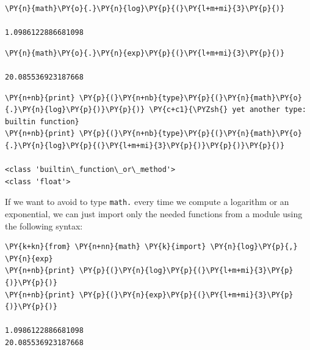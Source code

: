 \begin{tcolorbox}[breakable, size=fbox, boxrule=1pt, pad at break*=1mm, colback=cellbackground, colframe=cellborder]            
\begin{Verbatim}[commandchars=\\\{\}]
\PY{n}{math}\PY{o}{.}\PY{n}{log}\PY{p}{(}\PY{l+m+mi}{3}\PY{p}{)}

1.0986122886681098
\end{Verbatim}
\end{tcolorbox}

\begin{tcolorbox}[breakable, size=fbox, boxrule=1pt, pad at break*=1mm, colback=cellbackground, colframe=cellborder]            
\begin{Verbatim}[commandchars=\\\{\}]
\PY{n}{math}\PY{o}{.}\PY{n}{exp}\PY{p}{(}\PY{l+m+mi}{3}\PY{p}{)}

20.085536923187668
\end{Verbatim}
\end{tcolorbox}

\begin{tcolorbox}[breakable, size=fbox, boxrule=1pt, pad at break*=1mm, colback=cellbackground, colframe=cellborder]            
\begin{Verbatim}[commandchars=\\\{\}]
\PY{n+nb}{print} \PY{p}{(}\PY{n+nb}{type}\PY{p}{(}\PY{n}{math}\PY{o}{.}\PY{n}{log}\PY{p}{)}\PY{p}{)} \PY{c+c1}{\PYZsh{} yet another type: builtin function}
\PY{n+nb}{print} \PY{p}{(}\PY{n+nb}{type}\PY{p}{(}\PY{n}{math}\PY{o}{.}\PY{n}{log}\PY{p}{(}\PY{l+m+mi}{3}\PY{p}{)}\PY{p}{)}\PY{p}{)}

<class 'builtin\_function\_or\_method'>
<class 'float'>
\end{Verbatim}
\end{tcolorbox}

If we want to avoid to type \texttt{math.} every time we compute a logarithm or an exponential, we can just import only the needed functions from a module using the following syntax:

\begin{tcolorbox}[breakable, size=fbox, boxrule=1pt, pad at break*=1mm, colback=cellbackground, colframe=cellborder]            
\begin{Verbatim}[commandchars=\\\{\}]
\PY{k+kn}{from} \PY{n+nn}{math} \PY{k}{import} \PY{n}{log}\PY{p}{,} \PY{n}{exp}
\PY{n+nb}{print} \PY{p}{(}\PY{n}{log}\PY{p}{(}\PY{l+m+mi}{3}\PY{p}{)}\PY{p}{)}
\PY{n+nb}{print} \PY{p}{(}\PY{n}{exp}\PY{p}{(}\PY{l+m+mi}{3}\PY{p}{)}\PY{p}{)}

1.0986122886681098
20.085536923187668
\end{Verbatim}
\end{tcolorbox}

